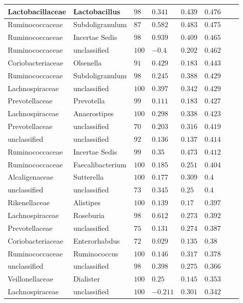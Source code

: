 \begin{table}[!ht]
\begin{tiny}
\begin{tabular}{|l|l|l|l|l|l|l|l|}
Lactobacillaceae & Lactobacillus & $98$ & $0.341$ & $0.439$ & $0.476$ \\ \hline
Ruminococcaceae & Subdoligranulum & $87$ & $0.582$ & $0.483$ & $0.475$ \\ \hline
Ruminococcaceae & Incertae Sedis & $98$ & $0.939$ & $0.409$ & $0.465$ \\ \hline
Ruminococcaceae & unclassified & $100$ & $-0.4$ & $0.202$ & $0.462$ \\ \hline
Coriobacteriaceae & Olsenella & $91$ & $0.429$ & $0.183$ & $0.443$ \\ \hline
Ruminococcaceae & Subdoligranulum & $98$ & $0.245$ & $0.388$ & $0.429$ \\ \hline
Lachnospiraceae & unclassified & $100$ & $0.397$ & $0.342$ & $0.429$ \\ \hline
Prevotellaceae & Prevotella & $99$ & $0.111$ & $0.183$ & $0.427$ \\ \hline
Lachnospiraceae & Anaerostipes & $100$ & $0.298$ & $0.338$ & $0.423$ \\ \hline
Prevotellaceae & unclassified & $70$ & $0.203$ & $0.316$ & $0.419$ \\ \hline
unclassified & unclassified & $92$ & $0.136$ & $0.137$ & $0.414$ \\ \hline
Ruminococcaceae & Incertae Sedis & $99$ & $0.35$ & $0.473$ & $0.412$ \\ \hline
Ruminococcaceae & Faecalibacterium & $100$ & $0.185$ & $0.251$ & $0.404$ \\ \hline
Alcaligenaceae & Sutterella & $100$ & $0.177$ & $0.309$ & $0.4$ \\ \hline
unclassified & unclassified & $73$ & $0.345$ & $0.25$ & $0.4$ \\ \hline
Rikenellaceae & Alistipes & $100$ & $0.139$ & $0.17$ & $0.397$ \\ \hline
Lachnospiraceae & Roseburia & $98$ & $0.612$ & $0.273$ & $0.392$ \\ \hline
Prevotellaceae & unclassified & $75$ & $0.131$ & $0.274$ & $0.387$ \\ \hline
Coriobacteriaceae & Enterorhabdus & $72$ & $0.029$ & $0.135$ & $0.38$ \\ \hline
Ruminococcaceae & Ruminococcus & $100$ & $0.146$ & $0.317$ & $0.378$ \\ \hline
unclassified & unclassified & $98$ & $0.398$ & $0.275$ & $0.366$ \\ \hline
Veillonellaceae & Dialister & $100$ & $0.25$ & $0.145$ & $0.353$ \\ \hline
Lachnospiraceae & unclassified & $100$ & $-0.211$ & $0.301$ & $0.342$ \\ \hline

\end{tabular}
\end{tiny}
\end{table}
